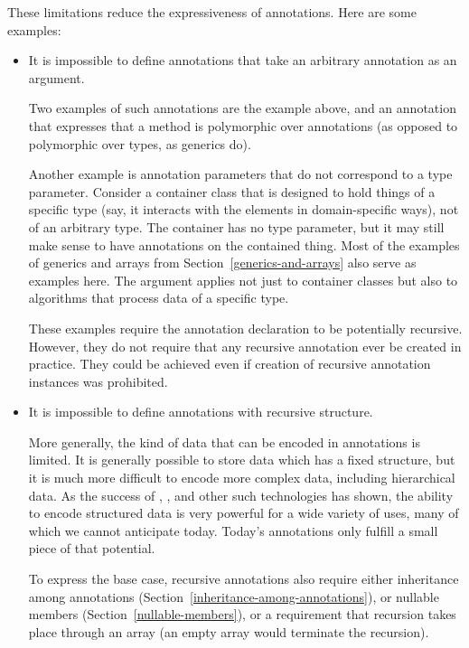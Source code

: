 \documentclass[10pt]{article}
\begin{document}
These limitations reduce the expressiveness of annotations.  Here are some
examples:
\begin{itemize}
\item
  It is impossible to define annotations that take an arbitrary annotation
  as an argument.

  Two examples of such annotations are the 
  example above, and an annotation that expresses that a method is
  polymorphic over annotations (as opposed to polymorphic over types, as
  generics do).

  Another example is annotation parameters that do not correspond to a type
  parameter.  Consider a container class that is designed to hold things of
  a specific type (say, it interacts with the elements in domain-specific
  ways), not of an arbitrary type.  The container has no type parameter,
  but it may still make sense to have annotations on the contained thing.
  Most of the examples of generics and arrays from
  Section~\ref{generics-and-arrays} also serve as examples here.  The
  argument applies not just to container classes but also to algorithms
  that process data of a specific type.

  These examples require the annotation declaration to be potentially
  recursive.  However, they do not require that any recursive annotation
  ever be created in practice.  They could be achieved even if creation of
  recursive annotation instances was prohibited.

\item
  It is impossible to define annotations with recursive structure.

  More generally, the kind of data that can be encoded in annotations is
  limited.  It is generally possible to store data which has a fixed
  structure, but it is much more difficult to encode more complex data,
  including hierarchical data.  As the success of , , and other such
  technologies has shown, the ability to encode structured data is very
  powerful for a wide variety of uses, many of which we cannot anticipate
  today.  Today's annotations only fulfill a small piece of that potential.

  To express the base case, recursive annotations also require either
  inheritance among annotations
  (Section~\ref{inheritance-among-annotations}), or nullable members
  (Section~\ref{nullable-members}), or a requirement that recursion takes
  place through an array (an empty array would terminate the recursion).

\end{itemize}
\end{document}
